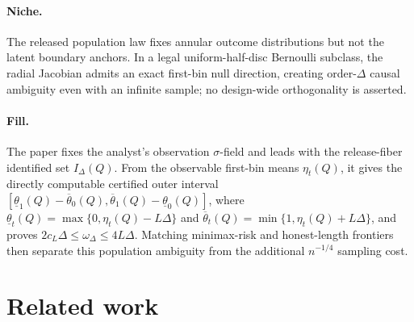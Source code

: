 \documentclass{article}
\begin{document}
\paragraph{Niche.} The released population law fixes annular outcome distributions but not the latent boundary anchors.  In a legal uniform-half-disc Bernoulli subclass, the radial Jacobian admits an exact first-bin null direction, creating order-\(\Delta\) causal ambiguity even with an infinite sample; no design-wide orthogonality is asserted.

\paragraph{Fill.} The paper fixes the analyst's observation \(\sigma\)-field and leads with the release-fiber identified set \(I_\Delta(Q)\). From the observable first-bin means \(\eta_t(Q)\), it gives the directly computable certified outer interval \([\underline{\theta}_1(Q)-\overline{\theta}_0(Q),\overline{\theta}_1(Q)-\underline{\theta}_0(Q)]\), where \(\underline{\theta}_t(Q)=\max\{0,\eta_t(Q)-L\Delta\}\) and \(\overline{\theta}_t(Q)=\min\{1,\eta_t(Q)+L\Delta\}\), and proves \(2c_L\Delta\leq\omega_\Delta\leq4L\Delta\). Matching minimax-risk and honest-length frontiers then separate this population ambiguity from the additional \(n^{-1/4}\) sampling cost.

\section{Related work}
\end{document}
